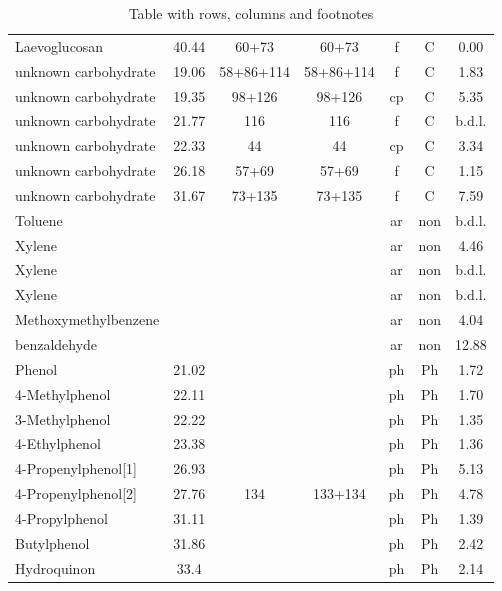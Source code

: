 \begin{table*}[p]
\begin{center}
\begin{tabular}{lcccccc}
Laevoglucosan&40.44&60+73&60+73&f&C&0.00\\
unknown carbohydrate&19.06&58+86+114&58+86+114&f&C&1.83\\
unknown carbohydrate&19.35&98+126&98+126&cp&C&5.35\\
unknown carbohydrate&21.77&116&116&f&C&b.d.l.\\
unknown carbohydrate&22.33&44&44&cp&C&3.34\\
unknown carbohydrate&26.18&57+69&57+69&f&C&1.15\\
unknown carbohydrate&31.67&73+135&73+135&f&C&7.59\\
Toluene&&&&ar&non&b.d.l.\\
Xylene&&&&ar&non&4.46\\
Xylene&&&&ar&non&b.d.l.\\
Xylene&&&&ar&non&b.d.l.\\
Methoxymethylbenzene&&&&ar&non&4.04\\
benzaldehyde&&&&ar&non&12.88\\
Phenol&21.02&&&ph&Ph&1.72\\
4-Methylphenol&22.11&&&ph&Ph&1.70\\
3-Methylphenol&22.22&&&ph&Ph&1.35\\
4-Ethylphenol&23.38&&&ph&Ph&1.36\\
4-Propenylphenol[1]&26.93&&&ph&Ph&5.13\\
4-Propenylphenol[2]&27.76&134&133+134&ph&Ph&4.78\\
4-Propylphenol&31.11&&&ph&Ph&1.39\\
Butylphenol&31.86&&&ph&Ph&2.42\\%
Hydroquinon&33.4&&&ph&Ph&2.14\\%
\hline
\end{tabular}
 \caption{Table with rows, columns and footnotes}
\end{center}
\label{tab:pyrprod1}
\end{table*}


